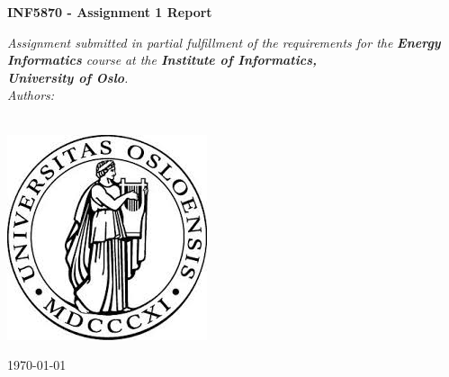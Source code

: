 
\begin{titlepage}
\begin{center}

\vspace*{.06\textheight}

{\huge \bfseries INF5870 - Assignment 1 Report \par}\vspace{1cm} %

\Large \textit{Assignment submitted in partial fulfillment of the requirements for the}
\textit{\textbf{Energy Informatics} course}  %
\textit{at the \textbf{Institute of Informatics,}}\\
\textit{\textbf{University of Oslo}.}\\[1cm]

\Large \textit{Authors:}\\
\LARGE \authorname\\

\vfill

\includegraphics[scale=0.5]{uioLogo.jpg}\\[1cm]

\vfill

{\large \today}\\[4cm] %

\vfill
\end{center}
\end{titlepage}
